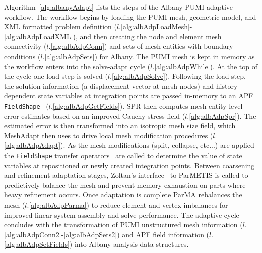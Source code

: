Algorithm~\ref{alg:albanyAdapt} lists the steps of the Albany-PUMI adaptive
workflow.
The workflow begins by loading the PUMI mesh, geometric model, and XML formatted
problem definition ($l.$\ref{alg:albAdpLoadMesh}-\ref{alg:albAdpLoadXML}),
and then creating the node and element mesh connectivity
($l.$\ref{alg:albAdpConn}) and sets of mesh
entities with boundary conditions ($l.$\ref{alg:albAdpSets}) for Albany.
The PUMI mesh is kept in memory as the workflow enters into the solve-adapt
cycle ($l.$\ref{alg:albAdpWhile}).
At the top of the cycle one load step is solved ($l.$\ref{alg:albAdpSolve}).
Following the load step, the solution information (a displacement vector at
mesh nodes) and history-dependent state variables at integration points are
passed in-memory to an APF
\texttt{FieldShape}~\cite{ibanez2016pumi} ($l.$\ref{alg:albAdpGetFields}).
SPR then computes mesh-entity level error estimates based on an
improved Cauchy stress field ($l.$\ref{alg:albAdpSpr}).
The estimated error is then transformed into an isotropic mesh size field, which
MeshAdapt then uses to drive local mesh
modification procedures ($l.$\ref{alg:albAdpAdapt}).
As the mesh modifications (split, collapse, etc...) are applied the
\texttt{FieldShape} transfer operators~\cite{radovitzky1999,ortiz1991}
are called to determine the value of state variables at repositioned or newly
created integration points.
Between coarsening and refinement adaptation stages, Zoltan's
interface~\cite{devine2002zoltan} to ParMETIS is called to predictively balance
the mesh and prevent memory exhaustion on parts where heavy refinement occurs.
Once adaptation is complete ParMA rebalances the mesh
($l.$\ref{alg:albAdpParma}) to reduce element and vertex imbalances for improved
linear system assembly and solve performance.
The adaptive cycle concludes with the transformation of PUMI
unstructured mesh information ($l.$\ref{alg:albAdpConn2}-\ref{alg:albAdpSets2})
and APF field information ($l.$\ref{alg:albAdpSetFields}) into Albany analysis
data structures.

